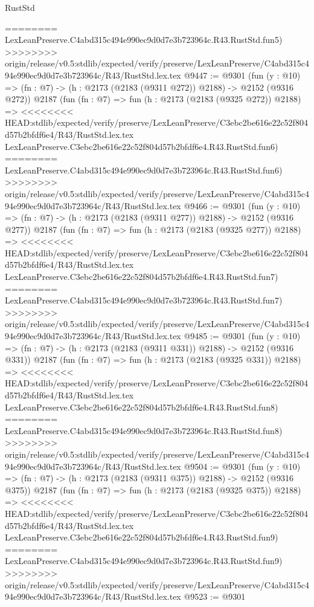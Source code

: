 \begin{lexlean}{RustStd}
\begin{coremodule}
{\begin{coremodule}
{{{{{{{{{{{{{{{========
    LexLeanPreserve.C4abd315c494e990ec9d0d7e3b723964c.R43.RustStd.fun5)
>>>>>>>> origin/release/v0.5:stdlib/expected/verify/preserve/LexLeanPreserve/C4abd315c494e990ec9d0d7e3b723964c/R43/RustStd.lex.tex
@9447 := @9301
    (fun (y : @10) => (fn : @7) -> (h : @2173 (@2183 (@9311 @272)) @2188) -> @2152 (@9316 @272))
    @2187
    (fun (fn : @7) =>
    fun (h : @2173 (@2183 (@9325 @272)) @2188) =>
<<<<<<<< HEAD:stdlib/expected/verify/preserve/LexLeanPreserve/C3ebc2be616e22c52f804d57b2bfdf6e4/R43/RustStd.lex.tex
    LexLeanPreserve.C3ebc2be616e22c52f804d57b2bfdf6e4.R43.RustStd.fun6)
========
    LexLeanPreserve.C4abd315c494e990ec9d0d7e3b723964c.R43.RustStd.fun6)
>>>>>>>> origin/release/v0.5:stdlib/expected/verify/preserve/LexLeanPreserve/C4abd315c494e990ec9d0d7e3b723964c/R43/RustStd.lex.tex
@9466 := @9301
    (fun (y : @10) => (fn : @7) -> (h : @2173 (@2183 (@9311 @277)) @2188) -> @2152 (@9316 @277))
    @2187
    (fun (fn : @7) =>
    fun (h : @2173 (@2183 (@9325 @277)) @2188) =>
<<<<<<<< HEAD:stdlib/expected/verify/preserve/LexLeanPreserve/C3ebc2be616e22c52f804d57b2bfdf6e4/R43/RustStd.lex.tex
    LexLeanPreserve.C3ebc2be616e22c52f804d57b2bfdf6e4.R43.RustStd.fun7)
========
    LexLeanPreserve.C4abd315c494e990ec9d0d7e3b723964c.R43.RustStd.fun7)
>>>>>>>> origin/release/v0.5:stdlib/expected/verify/preserve/LexLeanPreserve/C4abd315c494e990ec9d0d7e3b723964c/R43/RustStd.lex.tex
@9485 := @9301
    (fun (y : @10) => (fn : @7) -> (h : @2173 (@2183 (@9311 @331)) @2188) -> @2152 (@9316 @331))
    @2187
    (fun (fn : @7) =>
    fun (h : @2173 (@2183 (@9325 @331)) @2188) =>
<<<<<<<< HEAD:stdlib/expected/verify/preserve/LexLeanPreserve/C3ebc2be616e22c52f804d57b2bfdf6e4/R43/RustStd.lex.tex
    LexLeanPreserve.C3ebc2be616e22c52f804d57b2bfdf6e4.R43.RustStd.fun8)
========
    LexLeanPreserve.C4abd315c494e990ec9d0d7e3b723964c.R43.RustStd.fun8)
>>>>>>>> origin/release/v0.5:stdlib/expected/verify/preserve/LexLeanPreserve/C4abd315c494e990ec9d0d7e3b723964c/R43/RustStd.lex.tex
@9504 := @9301
    (fun (y : @10) => (fn : @7) -> (h : @2173 (@2183 (@9311 @375)) @2188) -> @2152 (@9316 @375))
    @2187
    (fun (fn : @7) =>
    fun (h : @2173 (@2183 (@9325 @375)) @2188) =>
<<<<<<<< HEAD:stdlib/expected/verify/preserve/LexLeanPreserve/C3ebc2be616e22c52f804d57b2bfdf6e4/R43/RustStd.lex.tex
    LexLeanPreserve.C3ebc2be616e22c52f804d57b2bfdf6e4.R43.RustStd.fun9)
========
    LexLeanPreserve.C4abd315c494e990ec9d0d7e3b723964c.R43.RustStd.fun9)
>>>>>>>> origin/release/v0.5:stdlib/expected/verify/preserve/LexLeanPreserve/C4abd315c494e990ec9d0d7e3b723964c/R43/RustStd.lex.tex
@9523 := @9301
}}}}}}}}}}}}}}}
\end{coremodule}}
\end{coremodule}
\end{lexlean}
